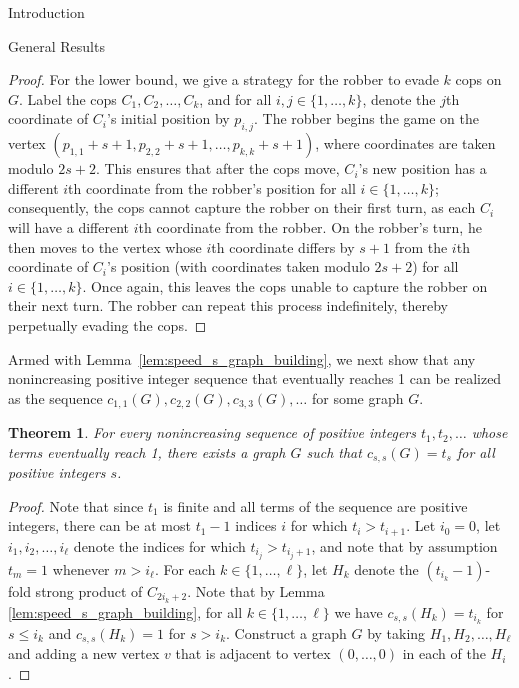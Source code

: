 \documentclass[12pt]{amsart}
\newtheorem{theorem}[lemma]{Theorem}
\theoremstyle{definition}
\newcommand{\speeds}{c_{s,s}}
\newcommand{\speed}[1]{c_{#1,#1}}
\begin{document}
\begin{section}{Introduction}
\begin{section}{General Results}
\begin{proof}

For the lower bound, we give a strategy for the robber to evade $k$ cops on $G$.  Label the cops $C_1, C_2, \dots, C_k$, and for all $i,j \in \{1, \dots, k\}$, denote the $j$th coordinate of $C_i$'s initial position by $p_{i,j}$.  The robber begins the game on the vertex $(p_{1,1}+s+1, p_{2,2}+s+1, \dots, p_{k,k}+s+1)$, where coordinates are taken modulo $2s+2$.  This ensures that after the cops move, $C_i$'s new position has a different $i$th coordinate from the robber's position for all $i \in \{1, \dots, k\}$; consequently, the cops cannot capture the robber on their first turn, as each $C_i$ will have a different $i$th coordinate from the robber.  On the robber's turn, he then moves to the vertex whose $i$th coordinate differs by $s+1$ from the $i$th coordinate of $C_i$'s position (with coordinates taken modulo $2s+2$) for all $i \in \{1, \dots, k\}$.  Once again, this leaves the cops unable to capture the robber on their next turn.  The robber can repeat this process indefinitely, thereby perpetually evading the cops.
\end{proof}

Armed with Lemma~\ref{lem:speed_s_graph_building}, we next show that any nonincreasing positive integer sequence that eventually reaches 1 can be realized as the sequence $\speed{1}(G), \speed{2}(G), \speed{3}(G), \dots$ for some graph $G$. 

\begin{theorem} \label{thm:nonincreasing_sequence}
    For every nonincreasing sequence of positive integers $t_1,t_2,\dots$ whose terms eventually reach 1, there exists a graph $G$ such that $\speed{s}(G)=t_s$ for all positive integers $s$.
\end{theorem}
\begin{proof}
    Note that since $t_1$ is finite and all terms of the sequence are positive integers, there can be at most $t_1-1$ indices $i$ for which $t_i > t_{i+1}$.  Let $i_0 = 0$, let $i_1,i_2,\dots,i_\ell$ denote the indices for which $t_{i_j}>t_{i_{j}+1}$, and note that by assumption $t_m = 1$ whenever $m > i_{\ell}$.  For each $k\in \{1,\dots,\ell\}$, let $H_k$ denote the $(t_{i_k}-1)$-fold strong product of $C_{2i_k+2}$.  Note that by Lemma \ref{lem:speed_s_graph_building}, for all $k \in \{1, \dots, \ell\}$ we have $\speeds(H_k) = t_{i_k}$ for $s \le i_{k}$ and $\speeds(H_k) = 1$ for $s > i_{k}$.  Construct a graph $G$ by taking $H_1, H_2, \dots, H_{\ell}$ and adding a new vertex $v$ that is adjacent to vertex $(0, \dots, 0)$ in each of the $H_i$.
    

\end{proof}
\end{section}
\end{section}
\end{document}
